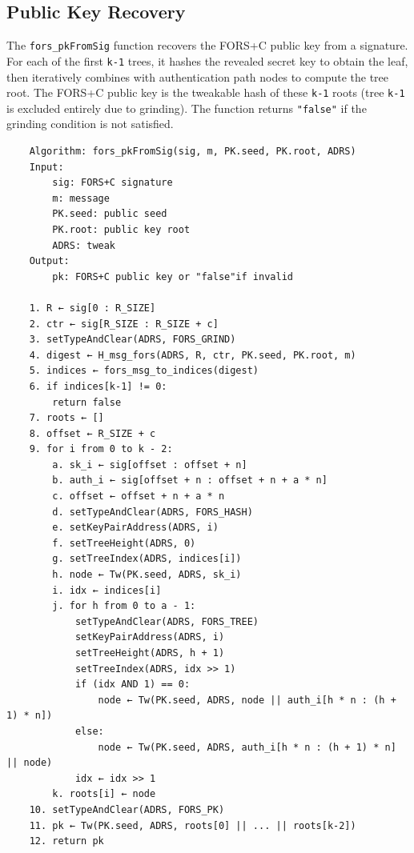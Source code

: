 \subsection{Public Key Recovery}
The \texttt{fors\_pkFromSig} function recovers the FORS+C public key from a signature. For each of the first \texttt{k-1} trees, it hashes the revealed secret key to obtain the leaf, then iteratively combines with authentication path nodes to compute the tree root. The FORS+C public key is the tweakable hash of these \texttt{k-1} roots (tree \texttt{k-1} is excluded entirely due to grinding). The function returns \texttt{"false"} if the grinding condition is not satisfied.
\begin{verbatim}
    Algorithm: fors_pkFromSig(sig, m, PK.seed, PK.root, ADRS)
    Input:
        sig: FORS+C signature
        m: message
        PK.seed: public seed
        PK.root: public key root
        ADRS: tweak
    Output:
        pk: FORS+C public key or "false"if invalid

    1. R ← sig[0 : R_SIZE]
    2. ctr ← sig[R_SIZE : R_SIZE + c]
    3. setTypeAndClear(ADRS, FORS_GRIND)
    4. digest ← H_msg_fors(ADRS, R, ctr, PK.seed, PK.root, m)
    5. indices ← fors_msg_to_indices(digest)
    6. if indices[k-1] != 0:
        return false
    7. roots ← []
    8. offset ← R_SIZE + c
    9. for i from 0 to k - 2:
        a. sk_i ← sig[offset : offset + n]
        b. auth_i ← sig[offset + n : offset + n + a * n]
        c. offset ← offset + n + a * n
        d. setTypeAndClear(ADRS, FORS_HASH)
        e. setKeyPairAddress(ADRS, i)
        f. setTreeHeight(ADRS, 0)
        g. setTreeIndex(ADRS, indices[i])
        h. node ← Tw(PK.seed, ADRS, sk_i)
        i. idx ← indices[i]
        j. for h from 0 to a - 1:
            setTypeAndClear(ADRS, FORS_TREE)
            setKeyPairAddress(ADRS, i)
            setTreeHeight(ADRS, h + 1)
            setTreeIndex(ADRS, idx >> 1)
            if (idx AND 1) == 0:
                node ← Tw(PK.seed, ADRS, node || auth_i[h * n : (h + 1) * n])
            else:
                node ← Tw(PK.seed, ADRS, auth_i[h * n : (h + 1) * n] || node)
            idx ← idx >> 1
        k. roots[i] ← node
    10. setTypeAndClear(ADRS, FORS_PK)
    11. pk ← Tw(PK.seed, ADRS, roots[0] || ... || roots[k-2])
    12. return pk
\end{verbatim}